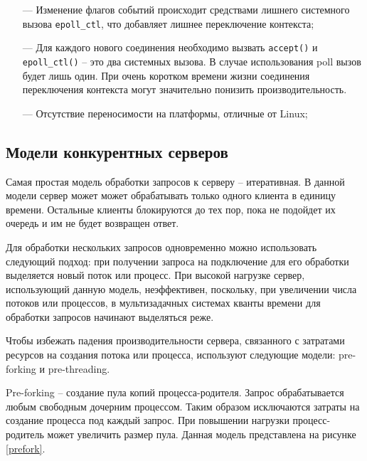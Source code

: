 \begin{itemize}
	\item[---] Изменение флагов событий происходит средствами лишнего системного вызова \texttt{epoll\_ctl}, что добавляет лишнее переключение контекста;
	
	\item[---] Для каждого нового соединения необходимо вызвать \texttt{accept()} и \texttt{epoll\_ctl()} -- это два системных вызова. В случае использования poll вызов будет лишь один. При очень коротком времени жизни соединения переключения контекста могут значительно понизить производительность.
	
	\item[---] Отсутствие переносимости на платформы, отличные от Linux;
\end{itemize}

\subsection{Модели конкурентных серверов}

Самая простая модель обработки запросов к серверу -- итеративная. В данной модели сервер может может обрабатывать только одного клиента в единицу времени. Остальные клиенты блокируются до тех пор, пока не подойдет их очередь и им не будет возвращен ответ.

Для обработки нескольких запросов одновременно можно использовать следующий подход: при получении запроса на подключение для его обработки выделяется новый поток или процесс. При высокой нагрузке сервер, использующий данную модель, неэффективен, поскольку, при увеличении числа потоков или процессов, в мультизадачных системах кванты времени для обработки запросов начинают выделяться реже.

Чтобы избежать падения производительности сервера, связанного с затратами ресурсов на создания потока или процесса, используют следующие модели: pre-forking и pre-threading.

Pre-forking -- создание пула копий процесса-родителя. Запрос обрабатывается любым свободным дочерним процессом. Таким образом исключаются затраты на создание процесса под каждый запрос. При повышении нагрузки процесс-родитель может увеличить размер пула. Данная модель представлена на рисунке \ref{prefork}.

